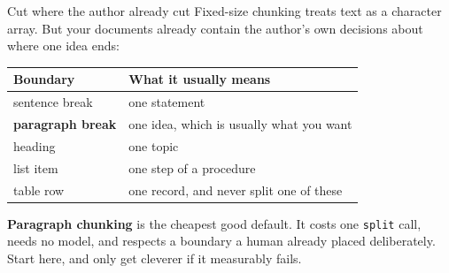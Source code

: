 \documentclass[aspectratio=169]{beamer}
\newcommand{\keybox}[1]{%
  \begin{tcolorbox}[colback=armblue!8, colframe=armblue, boxrule=0.6pt, arc=2pt]
  #1
  \end{tcolorbox}}
\begin{document}
\begin{frame}{Cut where the author already cut}
  \vspace{0.6em}
  Fixed-size chunking treats text as a character array. But your documents already contain
  the author's own decisions about where one idea ends:

  \vspace{0.8em}
  \begin{center}
  \small
  \begin{tabular}{ll}
    \toprule
    \textbf{Boundary} & \textbf{What it usually means} \\
    \midrule
    sentence break     & one statement \\
    \textbf{paragraph break} & one idea, which is usually what you want \\
    heading            & one topic \\
    list item          & one step of a procedure \\
    table row          & one record, and never split one of these \\
    \bottomrule
  \end{tabular}
  \end{center}

  \vspace{0.5em}
  \keybox{\textbf{Paragraph chunking} is the cheapest good default. It costs one
  \texttt{split} call, needs no model, and respects a boundary a human already placed
  deliberately. Start here, and only get cleverer if it measurably fails.}
\end{frame}
\end{document}
